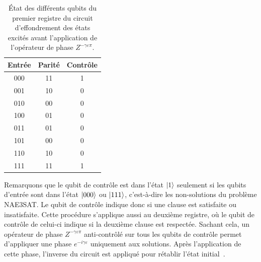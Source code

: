 \begin{table}[h]
    \centering
    \begin{tabular}{c c c}
        \hline
        Entrée & Parité & Contrôle \\
        \hline
        000 & 11 & 1 \\
        001 & 10 & 0 \\
        010 & 00 & 0 \\
        100 & 01 & 0 \\
        011 & 01 & 0 \\
        101 & 00 & 0 \\
        110 & 10 & 0 \\
        111 & 11 & 1 \\
        \hline
    \end{tabular}
    \caption{État des différents qubits du premier registre du circuit d'effondrement des états excités avant l'application de l'opérateur de phase $Z^{-\gamma \varepsilon \pi}$.}
    \label{tab:tower-excited-states-parity}
\end{table}

Remarquons que le qubit de contrôle est dans l'état $\ket{1}$ seulement si les qubits d'entrée sont dans l'état $\ket{000}$ ou $\ket{111}$, c'est-à-dire les non-solutions du problème NAE3SAT. Le qubit de contrôle indique donc si une clause est satisfaite ou insatisfaite. Cette procédure s'applique aussi au deuxième registre, où le qubit de contrôle de celui-ci indique si la deuxième clause est respectée. Sachant cela, un opérateur de phase $Z^{-\gamma \varepsilon \pi}$ anti-contrôlé sur tous les qubits de contrôle permet d'appliquer une phase $e^{-i \gamma \varepsilon}$ uniquement aux solutions. Après l'application de cette phase, l'inverse du circuit est appliqué pour rétablir l'état initial~\cite{nielsenQuantumComputationQuantum2011}.


